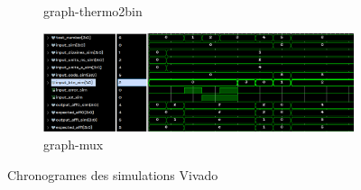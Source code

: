\begin{figure}[H]
\begin{subfigure}{.496\linewidth}
		\caption{graph-thermo2bin}
	\end{subfigure}
	\begin{subfigure}{.496\linewidth}
		\centering
		\includegraphics[width=\textwidth]{assets/img/graph-mux.png}
		\caption{graph-mux}
	\end{subfigure}
	\caption{Chronogrames des simulations Vivado}
\end{figure}

